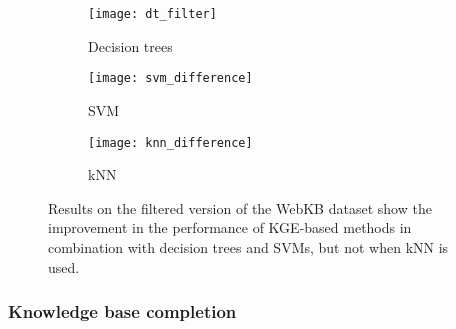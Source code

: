 \begin{figure}
	\centering
	\begin{subfigure}{0.32\linewidth}
		\centering
		\texttt{[image: dt\_filter]}
		\caption{Decision trees \label{fig:dt_difference}}
	\end{subfigure}
	\begin{subfigure}{0.32\linewidth}
		\centering
		\texttt{[image: svm\_difference]}
		\caption{SVM \label{fig:svm_difference}}
	\end{subfigure}
	\begin{subfigure}{0.32\linewidth}
		\centering
		\texttt{[image: knn\_difference]}
		\caption{kNN \label{fig:knn_difference}}
	\end{subfigure}
	\caption{Results on the filtered version of the WebKB dataset show the improvement in the performance of KGE-based methods in combination with decision trees and SVMs, but not when kNN is used.}
	\label{fig:filter_results}
\end{figure}








\subsubsection{Knowledge base completion}


\begin{table*}[h]
	\centering
	\caption{Knowledge base completion results}
	\label{tab:kbcres}
\end{table*}


